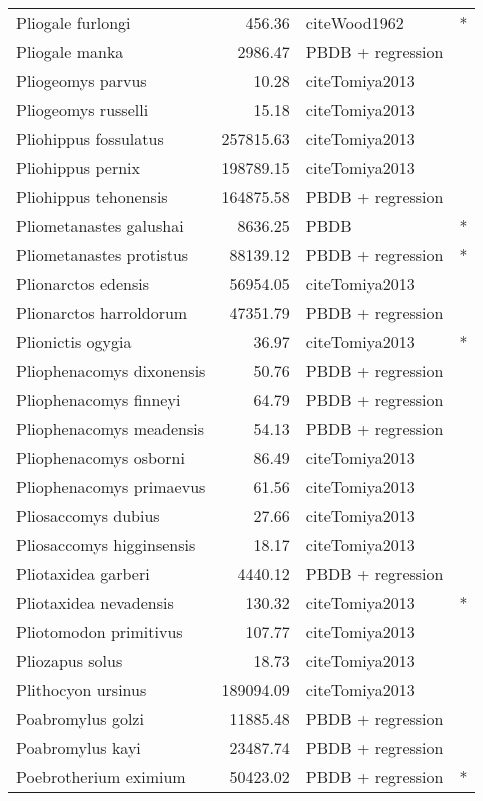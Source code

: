 \begin{table}[ht]
\begin{tabular}{lrll}
  Pliogale furlongi & 456.36 & cite{Wood1962} & * \\ 
  Pliogale manka & 2986.47 & PBDB + regression &  \\ 
  Pliogeomys parvus & 10.28 & cite{Tomiya2013} &  \\ 
  Pliogeomys russelli & 15.18 & cite{Tomiya2013} &  \\ 
  Pliohippus fossulatus & 257815.63 & cite{Tomiya2013} &  \\ 
  Pliohippus pernix & 198789.15 & cite{Tomiya2013} &  \\ 
  Pliohippus tehonensis & 164875.58 & PBDB + regression &  \\ 
  Pliometanastes galushai & 8636.25 & PBDB & * \\ 
  Pliometanastes protistus & 88139.12 & PBDB + regression & * \\ 
  Plionarctos edensis & 56954.05 & cite{Tomiya2013} &  \\ 
  Plionarctos harroldorum & 47351.79 & PBDB + regression &  \\ 
  Plionictis ogygia & 36.97 & cite{Tomiya2013} & * \\ 
  Pliophenacomys dixonensis & 50.76 & PBDB + regression &  \\ 
  Pliophenacomys finneyi & 64.79 & PBDB + regression &  \\ 
  Pliophenacomys meadensis & 54.13 & PBDB + regression &  \\ 
  Pliophenacomys osborni & 86.49 & cite{Tomiya2013} &  \\ 
  Pliophenacomys primaevus & 61.56 & cite{Tomiya2013} &  \\ 
  Pliosaccomys dubius & 27.66 & cite{Tomiya2013} &  \\ 
  Pliosaccomys higginsensis & 18.17 & cite{Tomiya2013} &  \\ 
  Pliotaxidea garberi & 4440.12 & PBDB + regression &  \\ 
  Pliotaxidea nevadensis & 130.32 & cite{Tomiya2013} & * \\ 
  Pliotomodon primitivus & 107.77 & cite{Tomiya2013} &  \\ 
  Pliozapus solus & 18.73 & cite{Tomiya2013} &  \\ 
  Plithocyon ursinus & 189094.09 & cite{Tomiya2013} &  \\ 
  Poabromylus golzi & 11885.48 & PBDB + regression &  \\ 
  Poabromylus kayi & 23487.74 & PBDB + regression &  \\ 
  Poebrotherium eximium & 50423.02 & PBDB + regression & * \\ 

\end{tabular}
\end{table}
